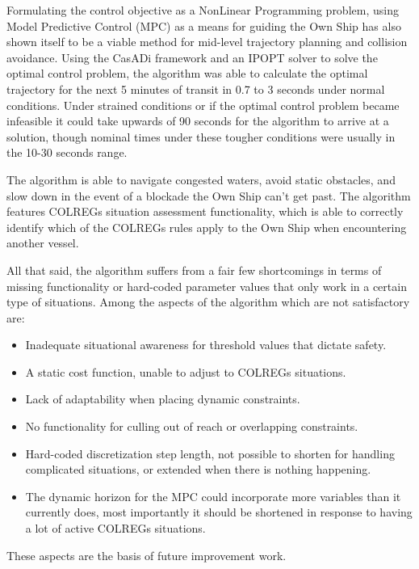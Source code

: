 Formulating the control objective as a NonLinear Programming problem, using Model Predictive Control (MPC) as a means for guiding the Own Ship has also 
shown itself to be a viable method for mid-level trajectory planning and collision avoidance. Using the CasADi framework and an IPOPT solver to solve the
optimal control problem, the algorithm was able to calculate the optimal trajectory for the next 5 minutes of transit in 0.7 to 3 seconds under normal conditions.
Under strained conditions or if the optimal control problem became infeasible it could take upwards of 90 seconds for the algorithm to arrive at a solution, though
nominal times under these tougher conditions were usually in the 10-30 seconds range.

The algorithm is able to navigate congested waters, avoid static obstacles, and slow down in the event of a blockade the Own Ship can't get past.
The algorithm features COLREGs situation assessment functionality, which is able to correctly identify which of the COLREGs 
rules apply to the Own Ship when encountering another vessel.

All that said, the algorithm suffers from a fair few shortcomings in terms of missing functionality or hard-coded parameter values that only work in a certain type
of situations. Among the aspects of the algorithm which are not satisfactory are: 
\begin{itemize}
    \item Inadequate situational awareness for threshold values that dictate safety.
    \item A static cost function, unable to adjust to COLREGs situations.
    \item Lack of adaptability when placing dynamic constraints.
    \item No functionality for culling out of reach or overlapping constraints.
    \item Hard-coded discretization step length, not possible to shorten for handling complicated situations, or extended when there is nothing happening.
    \item The dynamic horizon for the MPC could incorporate more variables than it currently does, most importantly it should be shortened in response to
    having a lot of active COLREGs situations.
\end{itemize}
These aspects are the basis of future improvement work.




\clearpage
